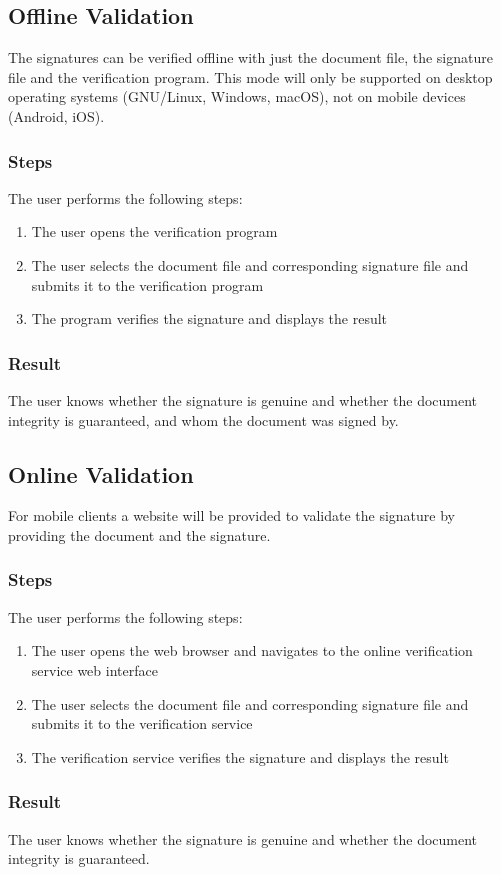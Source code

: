 \subsection{Offline Validation}\label{subsec:offline-validation2}
The signatures can be verified offline with just the document file, the signature file and the verification program.
This mode will only be supported on desktop operating systems (GNU/Linux, Windows, macOS), not on mobile devices (Android, iOS).

\subsubsection{Steps}
The user performs the following steps:
\begin{enumerate}
    \item The user opens the verification program
    \item The user selects the document file and corresponding signature file and submits it to the verification program
    \item The program verifies the signature and displays the result
\end{enumerate}
\subsubsection{Result}
The user knows whether the signature is genuine and whether the document integrity is guaranteed,
and whom the document was signed by.

\subsection{Online Validation}\label{subsec:semi-online-validation}
For mobile clients a website will be provided to validate the signature by providing the document and the signature.

\subsubsection{Steps}
The user performs the following steps:
\begin{enumerate}
    \item The user opens the web browser and navigates to the online verification service web interface
    \item The user selects the document file and corresponding signature file and submits it to the verification service
    \item The verification service verifies the signature and displays the result
\end{enumerate}
\subsubsection{Result}
The user knows whether the signature is genuine and whether the document integrity is guaranteed.
